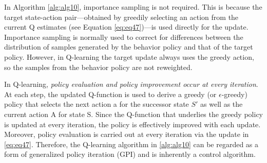 \documentclass[
	10pt, %
]{article}
\theoremstyle{plain}
\newcommand{\ti}[1]{\textit{#1}}
\numberwithin{equation}{subsection} %
\begin{document}
In Algorithm \cref{alg:alg10}, importance sampling is not required. 
This is because the target state-action pair—obtained by greedily selecting an action from the current Q estimates (see Equation \cref{eq:eq47})—is used directly for the update. 
Importance sampling is normally used to correct for differences between the distribution of samples generated by the behavior policy and that of the target policy. 
However, in Q-learning the target update always uses the greedy action, so the samples from the behavior policy are not reweighted.

In Q-learning, \ti{policy evaluation and policy improvement occur at every iteration}. 
At each step, the updated Q-function is used to derive a greedy (or $\epsilon$-greedy) policy that selects the next action a for the successor state $S'$ as well as the current action A for state S. 
Since the Q-function that underlies the greedy policy is updated at every iteration, the policy is effectively improved with each update. 
Moreover, policy evaluation is carried out at every iteration via the update in \cref{eq:eq47}.
Therefore, the Q-learning algorithm in \cref{alg:alg10} can be regarded as a form of generalized policy iteration (GPI) and is inherently a control algorithm.
\end{document}
